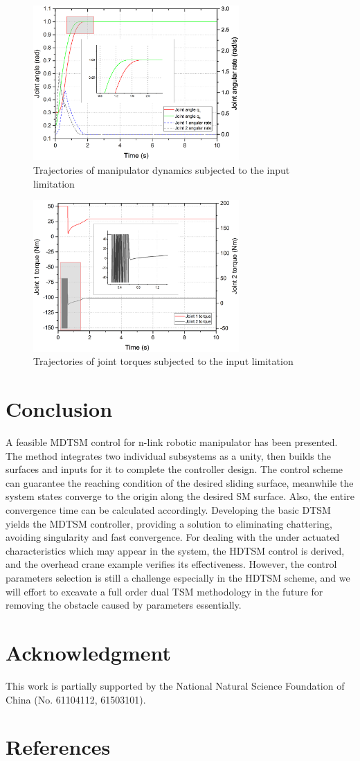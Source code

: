 \documentclass[3p]{elsarticle}
\theoremstyle{plain}
\theoremstyle{remark}
\begin{document}
\begin{figure}
\centering
\includegraphics[width=0.7\textwidth]{paper3_fig_limitation_q.eps}
\caption{Trajectories of manipulator dynamics subjected to the input limitation}
\label{Figure:limitation_q}
\end{figure}
\begin{figure}
\centering
\includegraphics[width=0.7\textwidth]{paper3_fig_limitation_torque.eps}
\caption{Trajectories of joint torques subjected to the input limitation}
\label{Figure:limitation_torque}
\end{figure}
\section{Conclusion}\label{sec:5}
A feasible MDTSM control for n-link robotic manipulator has been presented. The method integrates two individual subsystems as a unity, then builds the surfaces and inputs for it to complete the controller design. The control scheme can guarantee the reaching condition of the desired sliding surface, meanwhile the system states converge to the origin along the desired SM surface. Also, the entire convergence time can be calculated accordingly. Developing the basic DTSM yields the MDTSM controller, providing a solution to eliminating chattering, avoiding singularity and fast convergence. For dealing with the under actuated characteristics which may appear in the system, the HDTSM control is derived, and the overhead crane example verifies its effectiveness. However, the control parameters selection is still a challenge especially in the HDTSM scheme, and we will effort to excavate a full order dual TSM methodology in the future for removing the obstacle caused by parameters essentially.
\section{Acknowledgment}
This work is partially supported by the National Natural Science Foundation of China (No. 61104112, 61503101).
\section{References}


\end{document}
